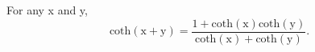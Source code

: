 For any x and y, 
\[ \mathrm{coth(x+y)} =
\frac{1 + \mathrm{coth(x)coth(y)}} 
{ \mathrm{coth(x)+coth(y)}} . \]
